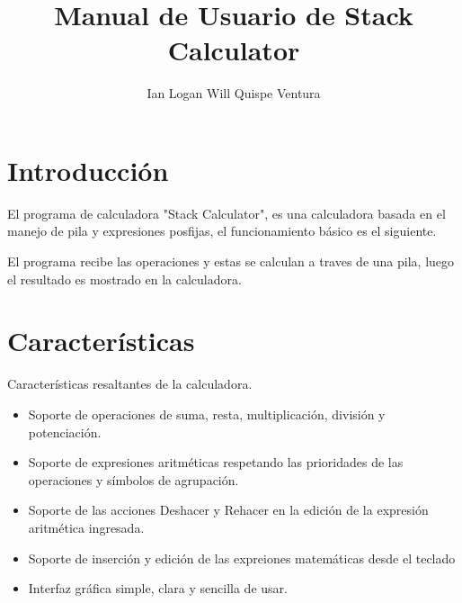 \documentclass[a4paper,12pt]{article}
\title{Manual de Usuario de Stack Calculator}
\author{Ian Logan Will Quispe Ventura}
\date{ }
\begin{document}
\maketitle

\section{Introducción}
El programa de calculadora "Stack Calculator", es una calculadora basada en el manejo de pila y expresiones posfijas, el funcionamiento básico es el siguiente.

El programa recibe las operaciones y estas se calculan a traves de una pila, luego el resultado es mostrado en la calculadora. 

\section{Características}
Características resaltantes de la calculadora.
\begin{itemize}
    \item Soporte de operaciones de suma, resta, multiplicación, división y potenciación.
    \item Soporte de expresiones aritméticas respetando las prioridades de las operaciones y símbolos de agrupación.
    \item Soporte de las acciones Deshacer y Rehacer en la edición de la expresión aritmética ingresada.
    \item Soporte de inserción y edición de las expreiones matemáticas desde el teclado 
    \item Interfaz gráfica simple, clara y sencilla de usar.
\end{itemize}
\end{document}
